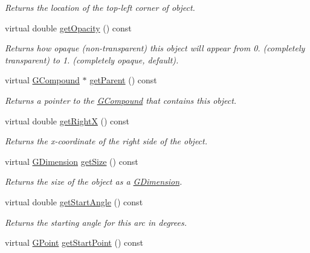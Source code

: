 \begin{DoxyCompactItemize}
\begin{DoxyCompactList}\small\item\em Returns the location of the top-\/left corner of object. \end{DoxyCompactList}\item 
virtual double \mbox{\hyperlink{classsgl_1_1GObject_a1ae3fc278cc5b71b9f2d96a8a83cdf26}{get\+Opacity}} () const
\begin{DoxyCompactList}\small\item\em Returns how opaque (non-\/transparent) this object will appear from 0. (completely transparent) to 1. (completely opaque, default). \end{DoxyCompactList}\item 
virtual \mbox{\hyperlink{classsgl_1_1GCompound}{G\+Compound}} $\ast$ \mbox{\hyperlink{classsgl_1_1GObject_a3e53cef70541b1a14eade4ad0984d0b4}{get\+Parent}} () const
\begin{DoxyCompactList}\small\item\em Returns a pointer to the {\ttfamily \mbox{\hyperlink{classsgl_1_1GCompound}{G\+Compound}}} that contains this object. \end{DoxyCompactList}\item 
virtual double \mbox{\hyperlink{classsgl_1_1GObject_a798cc79daaa10145b28f60bcdfdb0ee9}{get\+RightX}} () const
\begin{DoxyCompactList}\small\item\em Returns the {\itshape x}-\/coordinate of the right side of the object. \end{DoxyCompactList}\item 
virtual \mbox{\hyperlink{structsgl_1_1GDimension}{G\+Dimension}} \mbox{\hyperlink{classsgl_1_1GObject_a7b4eec96a2bdc6420695d5796a78eea9}{get\+Size}} () const
\begin{DoxyCompactList}\small\item\em Returns the size of the object as a {\ttfamily \mbox{\hyperlink{structsgl_1_1GDimension}{G\+Dimension}}}. \end{DoxyCompactList}\item 
virtual double \mbox{\hyperlink{classsgl_1_1GArc_ad52005815f95967f10ea54d290fa61ad}{get\+Start\+Angle}} () const
\begin{DoxyCompactList}\small\item\em Returns the starting angle for this arc in degrees. \end{DoxyCompactList}\item 
virtual \mbox{\hyperlink{structsgl_1_1GPoint}{G\+Point}} \mbox{\hyperlink{classsgl_1_1GArc_ad12beaa70993d9b409bfa8fd86c83957}{get\+Start\+Point}} () const

\end{DoxyCompactItemize}
